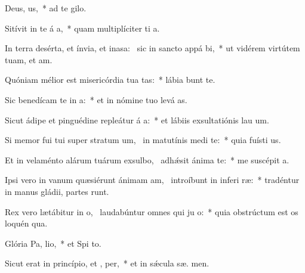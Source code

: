\item Deus,  us,~* ad te   gilo.
\item Sitívit in te á a,~* quam multiplíciter ti  a.
\item In terra desérta, et ínvia, et inasa:~\pscross{} sic in sancto appá bi,~* ut vidérem virtútem tuam, et  am.
\item Quóniam mélior est misericórdia tua  tas:~* lábia  bunt te.
\item Sic benedícam te in  a:~* et in nómine tuo levá  as.
\item Sicut ádipe et pinguédine repleátur á a:~* et lábiis exsultatiónis lau  um.
\item Si memor fui tui super stratum um,~\pscross{} in matutínis medi  te:~* quia fuísti  us.
\item Et in velaménto alárum tuárum exsulbo,~\pscross{} adhǽsit ánima   te:~* me suscépit  a.
\item Ipsi vero in vanum quæsiérunt ánimam am,~\pscross{} introíbunt in inferi ræ:~* tradéntur in manus gládii, partes  runt.
\item Rex vero lætábitur in o,~\pscross{} laudabúntur omnes qui ju  o:~* quia obstrúctum est os loquén qua.
\item Glória Pa,  lio,~* et Spi to.
\item Sicut erat in princípio, et ,  per,~* et in sǽcula sæ. men.
